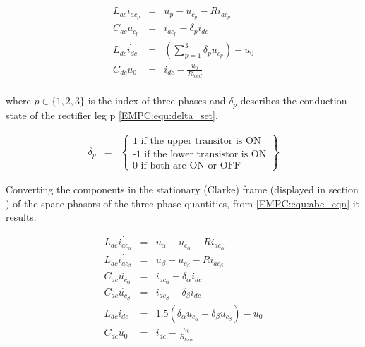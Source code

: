         \begin{equation}
        \begin{array}{rcl}
            L_{ac}\dot{i_{ac_p}}&=&u_p-u_{c_p}-Ri_{ac_p}\\
            C_{ac}\dot{u_{c_p}}&=&i_{ac_p}-\delta_pi_{dc}\\
            L_{dc}\dot{i_{dc}}&=&(\sum_{p=1}^{3}\delta_pu_{c_p})-u_0\\
            C_{dc}\dot{u_0}&=&i_{dc}-\frac{u_0}{R_{load}}\\
        \end{array}
        \label{EMPC:equ:abc_eqn}
    \end{equation}

    where $p\in\{1,2,3\}$ is the index of three phases and $\delta_p$ describes the conduction state of the rectifier leg p \ref{EMPC:equ:delta_set}.

    \begin{equation}
        \begin{array}{rcl}
            \delta_p&=&\begin{Bmatrix}
                \textrm{1 if the upper transitor is ON}\\
                \textrm{-1 if the lower transistor is ON}\\
                \textrm{0 if both are ON or OFF}
            \end{Bmatrix}
        \end{array}
        \label{EMPC:equ:delta_set}
    \end{equation}

    Converting the components in the stationary (Clarke) frame (displayed in section ) of the space phasors of the three-phase quantities, from \ref{EMPC:equ:abc_eqn} it results:

    \begin{equation}
        \begin{array}{rcl}
            L_{ac}\dot{i_{ac_\alpha}}&=&u_\alpha-u_{c_\alpha}-Ri_{ac_\alpha}\\
            L_{ac}\dot{i_{ac_\beta}}&=&u_\beta-u_{c_\beta}-Ri_{ac_\beta}\\
            C_{ac}\dot{u_{c_\alpha}}&=&i_{ac_\alpha}-\delta_\alpha i_{dc}\\
            C_{ac}\dot{u_{c_\beta}}&=&i_{ac_\beta}-\delta_\beta i_{dc}\\
            L_{dc}\dot{i_{dc}}&=&1.5(\delta_\alpha u_{c_\alpha}+\delta_\beta u_{c_\beta})-u_0\\
            C_{dc}\dot{u_0}&=&i_{dc}-\frac{u_0}{R_{load}}\\
        \end{array}
        \label{EMPC:equ:abc_alfabeta}
    \end{equation}

